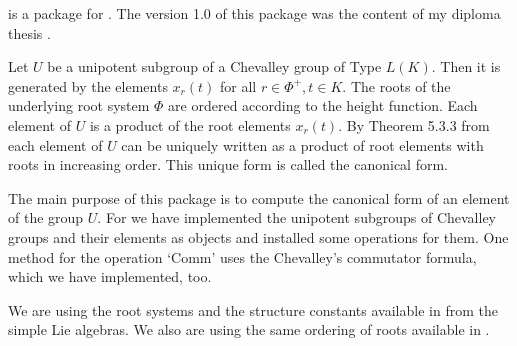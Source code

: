 

{\Unipot} is a package for {} \cite{GAP4}. The  version 1.0
of   this  package  was   the  content  of  my  diploma   thesis
\cite{SH2000}.

Let $U$ be a unipotent  subgroup of  a  Chevalley  group of Type
$L(K)$.  Then it is generated by  the  elements $x_r(t)$ for all
$r\in  \Phi^+,t\in K$. The roots of the underlying  root  system
$\Phi$  are  ordered  according  to  the height  function.  Each
element of  $U$ is  a product of the  root elements $x_r(t)$. By
Theorem 5.3.3 from  \cite{Car72}  each element of $U$ can  be
uniquely  written  as a product  of root  elements with roots in
increasing order. This unique form is called the canonical form.


The main  purpose  of this  package is to compute the  canonical
form of an element of the group $U$. For we have implemented the
unipotent subgroups  of Chevalley groups and  their elements  as
{\GAP} objects and  installed  some  operations  for  them.  One
method for the operation `Comm'  uses the Chevalley's commutator
formula, which we have implemented, too.



We  are  using  the  root  systems and  the  structure constants
available in {\GAP} from  the simple  Lie algebras. We  also are
using the same ordering of roots available in {\GAP}.


% 


